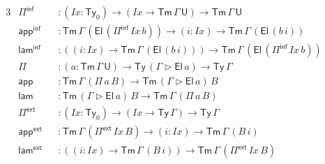 \documentclass[12pt,a4paper,twoside,openany]{book}
\theoremstyle{remark}
\theoremstyle{definition}
\theoremstyle{theorem}
\newcommand{\mi}[1]{\mathit{#1}}
\newcommand{\ms}[1]{\mathsf{#1}}
\newcommand{\Tm}{\mathsf{Tm}}
\newcommand{\Ty}{\mathsf{Ty}}
\newcommand{\U}{\mathsf{U}}
\newcommand{\El}{\mathsf{El}}
\newcommand{\ext}{\triangleright}
\newcommand{\Pie}{\Pi^{\mathsf{ext}}}
\newcommand{\appe}{\mathsf{app^{ext}}}
\newcommand{\lame}{\mathsf{lam^{ext}}}
\newcommand{\Piinf}{\Pi^{\mathsf{inf}}}
\newcommand{\appinf}{\mathsf{app^{inf}}}
\newcommand{\laminf}{\mathsf{lam^{inf}}}
\newcommand{\app}{\ms{app}}
\newcommand{\lam}{\ms{lam}}
\begin{document}
\begin{alignat*}{3}
  &\Piinf &&: (\mi{Ix} : \Ty_0) \to (\mi{Ix} \to \Tm\,\Gamma\,\U) \to \Tm\,\Gamma\,\U\\
  &\appinf &&: \Tm\,\Gamma\,(\El\,(\Piinf\,\mi{Ix}\,b)) \to (i : \mi{Ix}) \to \Tm\,\Gamma\,(\El\,(b\,i))\\
  &\laminf &&: ((i : \mi{Ix}) \to \Tm\,\Gamma\,(\El\,(b\,i))) \to \Tm\,\Gamma\,(\El\,(\Piinf\,\mi{Ix}\,b))\\
  &\Pi &&: (a : \Tm\,\Gamma\,\U) \to \Ty\,(\Gamma\ext \El\,a) \to \Ty\,\Gamma\\
  &\app &&: \Tm\,\Gamma\,(\Pi\,a\,B) \to \Tm\,(\Gamma \ext \El\,a)\,B\\
  &\lam &&: \Tm\,(\Gamma \ext \El\,a)\,B \to \Tm\,\Gamma\,(\Pi\,a\,B)\\
  &\Pie &&: (\mi{Ix} : \Ty_0) \to (\mi{Ix} \to \Ty\,\Gamma) \to \Ty\,\Gamma\\
  &\appe &&: \Tm\,\Gamma\,(\Pie\,\mi{Ix}\,B) \to (i : \mi{Ix}) \to \Tm\,\Gamma\,(B\,i)\\
  &\lame &&: ((i : \mi{Ix}) \to \Tm\,\Gamma\,(B\,i)) \to \Tm\,\Gamma\,(\Pie\,\mi{Ix}\,B)
\end{alignat*}
\end{document}
